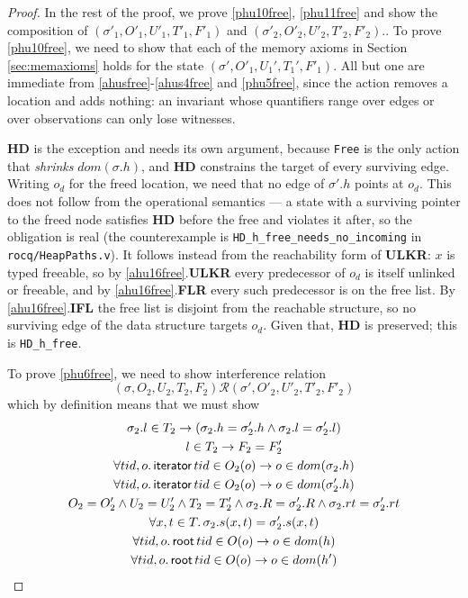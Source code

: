\begin{proof}
In the rest of the proof, we prove \ref{phu10free}, \ref{phu11free} and show the composition of $(\sigma'_1, O'_1, U'_1,T'_1,F'_1)$ and  $(\sigma'_2, O'_2, U'_2,T'_2,F'_2)$.. To prove \ref{phu10free}, we need to show that each of the memory axioms in Section \ref{sec:memaxioms} holds for the state $(\sigma',O'_1,U_1',T_1',F'_1)$.  All but one are immediate from \ref{ahusfree}-\ref{ahus4free} and \ref{phu5free}, since the action removes a location and adds nothing: an invariant whose quantifiers range over edges or over observations can only lose witnesses.

\textbf{HD} is the exception and needs its own argument, because \texttt{Free} is the only action that \emph{shrinks} $dom(\sigma.h)$, and \textbf{HD} constrains the target of every surviving edge.  Writing $o_d$ for the freed location, we need that no edge of $\sigma'.h$ points at $o_d$.  This does not follow from the operational semantics --- a state with a surviving pointer to the freed node satisfies \textbf{HD} before the free and violates it after, so the obligation is real (the counterexample is \texttt{HD\_h\_free\_needs\_no\_incoming} in \texttt{rocq/HeapPaths.v}).  It follows instead from the reachability form of \textbf{ULKR}: $x$ is typed \textsf{freeable}, so by \ref{ahu16free}.\textbf{ULKR} every predecessor of $o_d$ is itself \textsf{unlinked} or \textsf{freeable}, and by \ref{ahu16free}.\textbf{FLR} every such predecessor is on the free list.  By \ref{ahu16free}.\textbf{IFL} the free list is disjoint from the reachable structure, so no surviving edge of the data structure targets $o_d$.  Given that, \textbf{HD} is preserved; this is \texttt{HD\_h\_free}.

To prove \ref{phu6free}, we need to show interference relation
\[(\sigma, O_2, U_2, T_2,F_2) \mathcal{R} (\sigma', O'_2, U'_2, T'_2,F'_2)  \]
which by definition means that we must show 
\begin{gather}\label{phu17free}
  \sigma_2.l  \in  T_2 \rightarrow (\sigma_2.h =\sigma'_2.h \land \sigma_2.l=\sigma'_2.l)\\
  \label{phu18free}
  l\in T_2\rightarrow F_2=F_2'\\
  \label{phu20free}
  \forall tid,o\ldotp\textsf{iterator} \, tid \in O_2(o) \rightarrow o \in dom(\sigma_2.h) \\
  \label{phu21free}
  \forall tid,o\ldotp\textsf{iterator} \, tid \in O_2(o) \rightarrow o \in dom(\sigma'_2.h) \\
  \label{phu22free}
  O_2 = O_2' \land U_2 = U_2' \land T_2 = T_2'\land \sigma_2.R = \sigma'_2.R \land \sigma_2.rt = \sigma'_2.rt \\
  \label{phu23free}
  \forall x, t \in T \ldotp \sigma_2.s(x,t) = \sigma'_2.s(x,t) \\
    \label{phufreert1}
  \forall tid,o\ldotp\textsf{root} \, tid \in O(o) \rightarrow o \in dom(h) \\
  \label{phufreert2}
  \forall tid,o\ldotp\textsf{root} \, tid \in O(o) \rightarrow o \in dom(h') 
\end{gather}


\end{proof}
